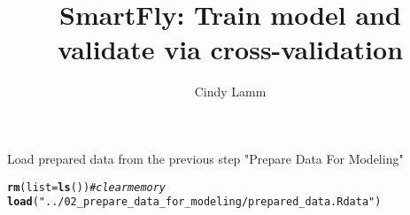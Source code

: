 \documentclass{article}\usepackage[]{graphicx}\usepackage[]{color}
\makeatletter
\newcommand{\hlstr}[1]{\textcolor[rgb]{0.192,0.494,0.8}{#1}}%
\newcommand{\hlcom}[1]{\textcolor[rgb]{0.678,0.584,0.686}{\textit{#1}}}%
\newcommand{\hlstd}[1]{\textcolor[rgb]{0.345,0.345,0.345}{#1}}%
\newcommand{\hlkwc}[1]{\textcolor[rgb]{0.333,0.667,0.333}{#1}}%
\newcommand{\hlkwd}[1]{\textcolor[rgb]{0.737,0.353,0.396}{\textbf{#1}}}%
\newenvironment{kframe}{%
 \def\at@end@of@kframe{}%
 \ifinner\ifhmode%
  \def\at@end@of@kframe{\end{minipage}}%
  \begin{minipage}{\columnwidth}%
 \fi\fi%
 \def\FrameCommand##1{\hskip\@totalleftmargin \hskip-\fboxsep
 \colorbox{shadecolor}{##1}\hskip-\fboxsep
     \hskip-\linewidth \hskip-\@totalleftmargin \hskip\columnwidth}%
 \MakeFramed {\advance\hsize-\width
   \@totalleftmargin\z@ \linewidth\hsize
   \@setminipage}}%
 {\par\unskip\endMakeFramed%
 \at@end@of@kframe}
\newenvironment{knitrout}{}{} %
\makeatother
\begin{document}
\title{SmartFly: Train model and validate via cross-validation}


\author{Cindy Lamm}

\maketitle

Load prepared data from the previous step "Prepare Data For Modeling"
\begin{knitrout}
\color{fgcolor}\begin{kframe}
\begin{alltt}
\hlkwd{rm}\hlstd{(}\hlkwc{list}\hlstd{=}\hlkwd{ls}\hlstd{())}   \hlcom{#clear memory}
\hlkwd{load}\hlstd{(}\hlstr{"../02_prepare_data_for_modeling/prepared_data.Rdata"}\hlstd{)}
\end{alltt}
\end{kframe}
\end{knitrout}
\end{document}
